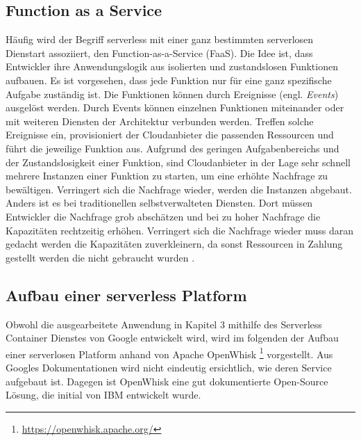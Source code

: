 \subsection{Function as a Service}
Häufig wird der Begriff serverless mit einer ganz bestimmten serverlosen Dienstart
assoziiert, den Function-as-a-Service (FaaS).
Die Idee ist, dass Entwickler ihre Anwendungslogik aus isolierten und 
zustandslosen Funktionen aufbauen. Es ist vorgesehen, dass jede Funktion nur für eine
ganz spezifische Aufgabe zuständig ist. Die Funktionen können
durch Ereignisse (engl. \textit{Events}) ausgelöst werden.
Durch Events können einzelnen Funktionen miteinander oder mit
weiteren Diensten der Architektur verbunden werden. 
Treffen solche Ereignisse ein, provisioniert der
Cloudanbieter die passenden Ressourcen und führt die jeweilige Funktion aus.
Aufgrund des geringen Aufgabenbereichs und der Zustandslosigkeit einer Funktion,
sind Cloudanbieter in der Lage sehr schnell mehrere Instanzen einer Funktion zu starten,
um eine erhöhte Nachfrage zu bewältigen.
Verringert sich die Nachfrage wieder, werden die Instanzen abgebaut. Anders ist 
es bei traditionellen selbstverwalteten Diensten. Dort müssen Entwickler die Nachfrage grob
abschätzen und bei zu hoher Nachfrage die Kapazitäten rechtzeitig
erhöhen. Verringert sich die Nachfrage wieder muss daran
gedacht werden die Kapazitäten zuverkleinern, da sonst
Ressourcen in Zahlung gestellt werden die nicht gebraucht wurden
\cite{WhatIsServerless} \cite{ServerlessTrends}.

\subsection{Aufbau einer serverless Platform}
Obwohl die ausgearbeitete Anwendung in Kapitel 3
mithilfe des Serverless Container Dienstes von Google entwickelt wird,
wird im folgenden der Aufbau einer serverlosen Platform
anhand von Apache OpenWhisk
\footnote{\url{https://openwhisk.apache.org/}} vorgestellt.
Aus Googles Dokumentationen wird nicht eindeutig ersichtlich, wie
deren Service aufgebaut ist. Dagegen ist OpenWhisk eine
gut dokumentierte Open-Source Lösung, die initial von IBM entwickelt
wurde.

